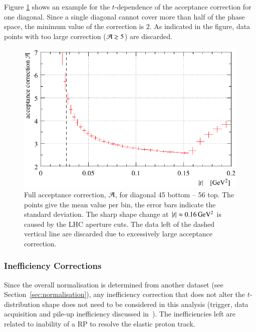 Figure \ref{fig:acceptance result} shows an example for the $t$-dependence of the acceptance correction for one diagonal. Since a single diagonal cannot cover more than half of the phase space, the minimum value of the correction is $2$. As indicated in the figure, data points with too large correction (${\cal A} \gtrsim 5$) are discarded.

\begin{figure}
\begin{center}
\includegraphics{fig/acc_corr_hists.pdf}
\vskip-3mm
\caption{%
Full acceptance correction, ${\cal A}$, for diagonal 45 bottom -- 56 top. The points give the mean value per bin, the error bars indicate the standard deviation. The sharp shape change at $|t|\approx 0.16\,{\rm GeV^2}$ is caused by the LHC aperture cuts. The data left of the dashed vertical line are discarded due to excessively large acceptance correction.
}
\label{fig:acceptance result}
\end{center}
\end{figure}


\subsubsection{Inefficiency Corrections}
\label{sec:ineff corr}

Since the overall normalisation is determined from another dataset (see Section~\ref{sec:normalisation}), any inefficiency correction that does not alter the $t$-distribution shape does not need to be considered in this analysis (trigger, data acquisition and pile-up inefficiency discussed in~\cite{epl101-el,prl111}). The inefficiencies left are related to inability of a RP to resolve the elastic proton track.

